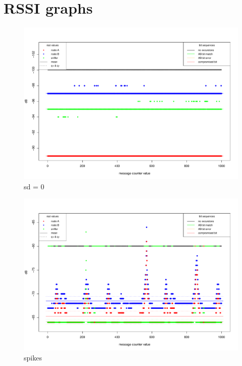 \documentclass[
  print, %
  Table,   %
  nolof,     %
  nolot,     %
           oneside
]{fithesis3}
\begin{document}
\chapter{RSSI graphs}
\begin{figure}[h!!!]
  \includegraphics[height=0.9\textwidth, angle = 90 ]{../images/graph_rssi_01.pdf}
\caption{sd = 0}
\label{fig:rssi_01}
\end{figure}

\begin{figure}
  \includegraphics[height=\textwidth, angle = 90 ]{../images/graph_rssi_02.pdf}
\caption{spikes}
\label{fig:rssi_02}
\end{figure}
\end{document}
